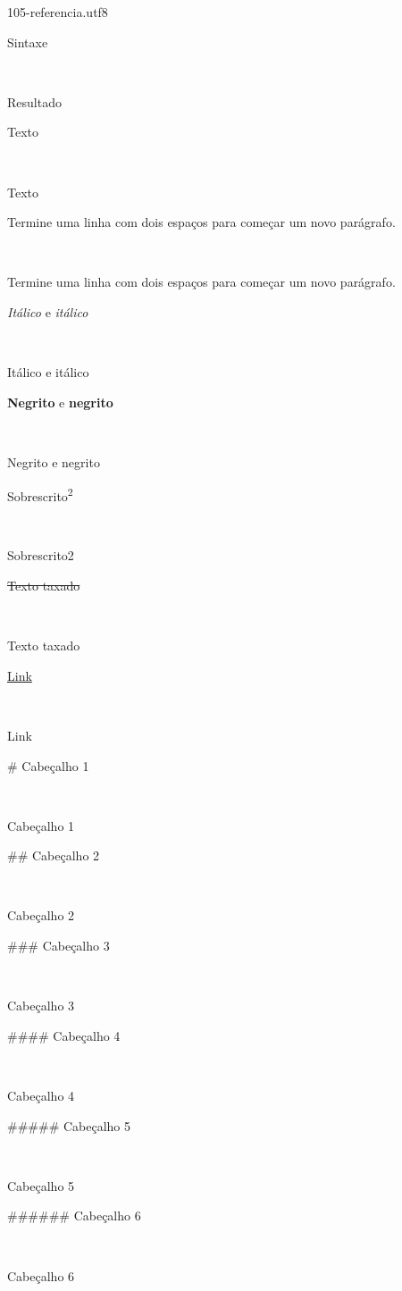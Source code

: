 \documentclass[
]{book}
\begin{document}
105-referencia.utf8

\hypertarget{header}{}

Sintaxe

~

Resultado

Texto

~

Texto

Termine uma linha com dois espaços para
começar um novo parágrafo.

~

Termine uma linha com dois espaços para começar um novo parágrafo.

\emph{Itálico} e \emph{itálico}

~

Itálico e itálico

\textbf{Negrito} e \textbf{negrito}

~

Negrito e negrito

Sobrescrito\textsuperscript{2}

~

Sobrescrito2

\sout{Texto taxado}

~

Texto taxado

\href{des.uem.br}{Link}

~

Link

\# Cabeçalho 1

~

\hypertarget{cabeuxe7alho-1}{}
Cabeçalho 1

\#\# Cabeçalho 2

~

\hypertarget{cabeuxe7alho-2}{}
Cabeçalho 2

\#\#\# Cabeçalho 3

~

\hypertarget{cabeuxe7alho-3}{}
Cabeçalho 3

\#\#\#\# Cabeçalho 4

~

\hypertarget{cabeuxe7alho-4}{}
Cabeçalho 4

\#\#\#\#\# Cabeçalho 5

~

\hypertarget{cabeuxe7alho-5}{}
Cabeçalho 5

\#\#\#\#\#\# Cabeçalho 6

~

\hypertarget{cabeuxe7alho-6}{}
Cabeçalho 6
\end{document}
